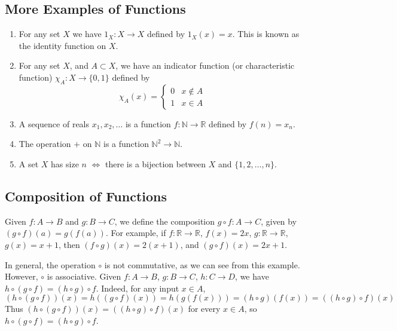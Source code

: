 \subsection{More Examples of Functions}
\begin{enumerate}
	\item For any set $X$ we have $1_X\colon X \to X$ defined by $1_X(x) = x$. This is known as the identity function on $X$.
	\item For any set $X$, and $A \subset X$, we have an indicator function (or characteristic function) $\chi_A\colon X \to \{ 0, 1 \}$ defined by
	      \[ \chi_A(x) = \begin{cases}
			      0 & x \notin A \\
			      1 & x \in A
		      \end{cases} \]
	\item A sequence of reals $x_1, x_2, \dots$ is a function $f\colon \mathbb N \to \mathbb R$ defined by $f(n) = x_n$.
	\item The operation $+$ on $\mathbb N$ is a function $\mathbb N^2 \to \mathbb N$.
	\item A set $X$ has size $n$ $\iff$ there is a bijection between $X$ and $\{ 1, 2, \dots, n \}$.
\end{enumerate}

\subsection{Composition of Functions}
Given $f\colon A \to B$ and $g\colon B \to C$, we define the composition $g\circ f \colon A \to C$, given by $(g\circ f)(a) = g(f(a))$. For example, if $f\colon \mathbb R \to \mathbb R$, $f(x) = 2x$, $g\colon \mathbb R \to \mathbb R$, $g(x) = x+1$, then $(f \circ g)(x) = 2(x+1)$, and $(g \circ f)(x) = 2x + 1$.

In general, the operation $\circ$ is not commutative, as we can see from this example. However, $\circ$ is associative. Given $f\colon A \to B$, $g\colon B \to C$, $h\colon C \to D$, we have $h \circ (g \circ f) = (h \circ g) \circ f$. Indeed, for any input $x \in A$,
\[ (h \circ (g \circ f))(x) = h((g \circ f)(x)) = h(g(f(x))) = (h \circ g)(f(x)) = ((h \circ g)\circ f)(x) \]
Thus $(h \circ (g \circ f))(x) = ((h \circ g)\circ f)(x)$ for every $x \in A$, so $h \circ (g \circ f) = (h \circ g)\circ f$.
